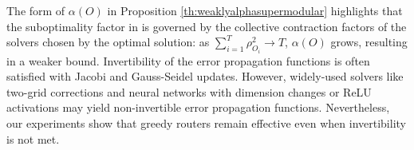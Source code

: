 \documentclass{article} %
\begin{document}
The form of $\alpha(O)$ in Proposition \ref{th:weaklyalphasupermodular} highlights that the suboptimality factor in  is governed by the collective contraction factors of the solvers chosen by the optimal solution: as $\sum_{i = 1}^{T} \rho_{O_i}^2 \to T$, $\alpha(O)$ grows, resulting in a weaker bound. 
Invertibility of the error propagation functions is often satisfied with Jacobi and Gauss-Seidel updates. However, widely-used solvers like two-grid corrections and neural networks with dimension changes or ReLU activations may yield non-invertible error propagation functions. Nevertheless, our experiments show that greedy routers remain effective even when invertibility is not met. 


\end{document}

